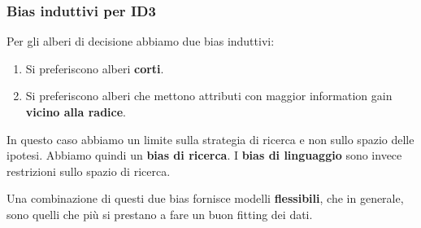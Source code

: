 \subsubsection{Bias induttivi per ID3}
Per gli alberi di decisione abbiamo due bias induttivi:
\begin{enumerate}
	\item Si preferiscono alberi \textbf{corti}.
	\item Si preferiscono alberi che mettono attributi con maggior information gain \textbf{vicino alla radice}.
\end{enumerate}
In questo caso abbiamo un limite sulla strategia di ricerca e non sullo spazio delle ipotesi. Abbiamo quindi un
\textbf{bias di ricerca}. I \textbf{bias di linguaggio} sono invece restrizioni sullo spazio di ricerca.

Una combinazione di questi due bias fornisce modelli \textbf{flessibili}, che in generale, sono quelli che pi\`u si
prestano a fare un buon fitting dei dati.